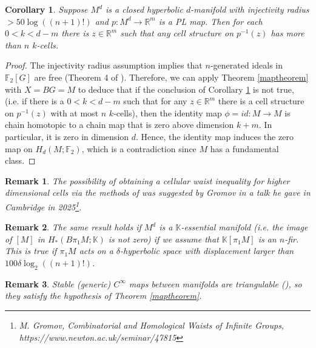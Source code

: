 \documentclass[11pt,letterpaper]{amsart}
\newtheorem{corollary}[theorem]{Corollary}
\newtheorem*{remark}{Remark}
\begin{document}
\begin{corollary}
\label{hypmanifoldcor}
Suppose $M^d$ is a closed hyperbolic $d$-manifold with injectivity radius $>50\log((n+1)!)$ and $p:M^d\rightarrow \mathbb R^m$ is a PL map. Then for each $0<k<d-m$ there is $z\in\mathbb R^m$ such that any cell structure on $p^{-1}(z)$ has more than $n$ $k$-cells. %
\end{corollary}

\begin{proof}
The injectivity radius assumption implies that $n$-generated ideals in $\mathbb F_2[G]$ are free (Theorem 4 of \cite{avramididelzanthyperbolic}). Therefore, we can apply Theorem \ref{maptheorem} with $X=BG=M$ to deduce that if the conclusion of Corollary \ref{hypmanifoldcor} is not true, (i.e. if there is a $0<k<d-m$ such that for any $z\in\mathbb R^m$ there is a cell structure on $p^{-1}(z)$ with at most $n$ $k$-cells), then the identity map $\phi=id:M\rightarrow M$ is chain homotopic to a chain map that is zero above dimension $k+m$. In particular, it is zero in dimension $d$. Hence, the identity map induces the zero map on $H_d(M;\mathbb F_2)$, which is a contradiction since $M$ has a fundamental class.%
\end{proof}
\begin{remark}
 The possibility of obtaining a cellular waist inequality for higher dimensional cells via the methods of \cite{avramididelzanthyperbolic} was suggested by Gromov in a talk he gave in Cambridge in 2025\footnote{M. Gromov, Combinatorial and Homological Waists of Infinite Groups, https://www.newton.ac.uk/seminar/47815}. 
\end{remark}

\begin{remark}
The same result holds if $M^d$ is a $\mathbb K$-essential manifold (i.e. the image of $[M]$ in $H_*(B\pi_1M;\mathbb K)$ is not zero) if we assume that $\mathbb K[\pi_1M]$ is an $n$-fir. This is true if $\pi_1M$ acts on a $\delta$-hyperbolic space with displacement larger than $100\delta\log_2((n+1)!)$.
\end{remark}
\begin{remark}
Stable (generic) $C^{\infty}$ maps between manifolds are triangulable (\cite{verona}), so they satisfy the hypothesis of Theorem \ref{maptheorem}. 
\end{remark}
\end{document}
